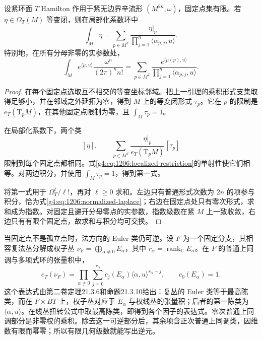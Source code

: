 \begin{theorem}[孤立固定点的等变积分]\label{g4:thm:1206:isolated-localization}
	设紧环面 \(T\) Hamilton 作用于紧无边界辛流形 \((M^{2n},\omega)\)，固定点集有限。若 \(\eta\in\Omega_T(M)\) 等变闭，则在局部化系数环中
	\begin{equation}\label{g4:eq:1206:isolated-localization}
		\int_M\eta
		=\sum_{p\in M^T}
		\frac{\eta|_p}{\prod_{j=1}^n\langle\alpha_{p,j},u\rangle}.
	\end{equation}
	特别地，在所有分母非零的实参数处，
	\begin{equation}\label{g4:eq:1206:exponential-localization}
		\int_M e^{\langle\mu,u\rangle}\frac{\omega^n}{(2\pi)^n n!}
		=\sum_{p\in M^T}
		\frac{e^{\langle\mu(p),u\rangle}}
		{\prod_{j=1}^n\langle\alpha_{p,j},u\rangle}.
	\end{equation}
\end{theorem}
\begin{proof}
	在每个固定点选取互不相交的等变坐标邻域。把上一引理的乘积形式支集取得足够小，并在邻域之外延拓为零，得到 \(M\) 上的等变闭形式 \(\tau_p\)。它在 \(p\) 的限制是 \(e_T(\mathrm{T}_pM)\)，在其他固定点限制为零，且 \(\int_M\tau_p=1\)。

	在局部化系数下，两个类
	\[
		[\eta],\qquad
		\sum_{p\in M^T}\frac{\eta|_p}{e_T(\mathrm{T}_pM)}[\tau_p]
	\]
	限制到每个固定点都相同。式\eqref{g4:eq:1206:localized-restriction}的单射性使它们相等。对两边积分，并使用 \(\int_M\tau_p=1\)，得到第一式。

	将第一式用于 \(\Omega_T^\ell/\ell!\)，再对 \(\ell\ge0\) 求和。左边只有普通形式次数为 \(2n\) 的项参与积分，恰为式\eqref{g4:eq:1206:normalized-laplace}；右边在固定点处只有零次形式，求和成为指数。对固定且避开分母零点的实参数，指数级数在紧 \(M\) 上一致收敛，右边只有有限个固定点，故求和与积分均可交换。
\end{proof}

当固定点不是孤立点时，法方向的 Euler 类仍可逆。设 \(F\) 为一个固定分支，其相容复法丛分解成权子丛
\(\nu_F=\bigoplus_{\alpha\ne0}E_\alpha\)，其中 \(r_\alpha=\operatorname{rank}_{\mathbb C}E_\alpha\)。在 \(F\) 的普通上同调与多项式环的张量积中，
\begin{equation}\label{g4:eq:1206:normal-euler}
	e_T(\nu_F)=
	\prod_{\alpha\ne0}
	\sum_{j=0}^{r_\alpha}c_j(E_\alpha)\langle\alpha,u\rangle^{r_\alpha-j},
	\qquad c_0(E_\alpha)=1.
\end{equation}
这个表达式由第二卷定理21.3.6和命题21.3.10给出：复丛的 Euler 类等于最高陈类，而在 \(F\times BT\) 上，权子丛对应于 \(E_\alpha\) 与权线丛的张量积；后者的第一陈类为 \(\langle\alpha,u\rangle\)。在线丛扭转公式中取最高陈类，即得到各个因子的表达式。零次普通上同调部分是非零权的乘积。除去这一可逆部分后，其余项含正次普通上同调类，因维数有限而幂零；所以有限几何级数就能写出逆元。

